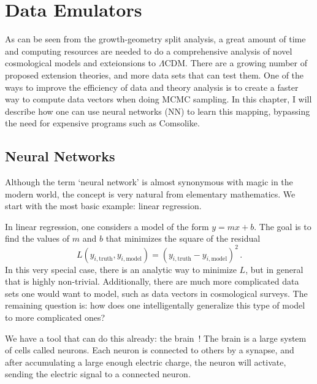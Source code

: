 \chapter{Data Emulators}
As can be seen from the growth-geometry split analysis, a great amount of time and computing resources are needed to do a comprehensive analysis of novel cosmological models and exteionsions to $\Lambda$CDM. There are a growing number of proposed extension theories, and more data sets that can test them. One of the ways to improve the efficiency of data and theory analysis is to create a faster way to compute data vectors when doing MCMC sampling. In this chapter, I will describe how one can use neural networks (NN) to learn this mapping, bypassing the need for expensive programs such as Comsolike.
\section{Neural Networks}
Although the term `neural network' is almost synonymous with magic in the modern world, the concept is very natural from elementary mathematics. We start with the most basic example: linear regression. 

In linear regression, one considers a model of the form $y=mx+b$. The goal is to find the values of $m$ and $b$ that minimizes the square of the residual
\begin{equation}
	L(y_{i,\mathrm{truth}},y_{i,\mathrm{model}}) = (y_{i,\mathrm{truth}} - y_{i,\mathrm{model}})^2\,.
\end{equation}
In this very special case, there is an analytic way to minimize $L$, but in general that is highly non-trivial. Additionally, there are much more complicated data sets one would want to model, such as data vectors in cosmological surveys. The remaining question is: how does one intelligentally generalize this type of model to more complicated ones?

We have a tool that can do this already: the brain~\cite{noauthor_what_nodate}! The brain is a large system of cells called neurons. Each neuron is connected to others by a synapse, and after accumulating a large enough electric charge, the neuron will activate, sending the electric signal to a connected neuron. 

